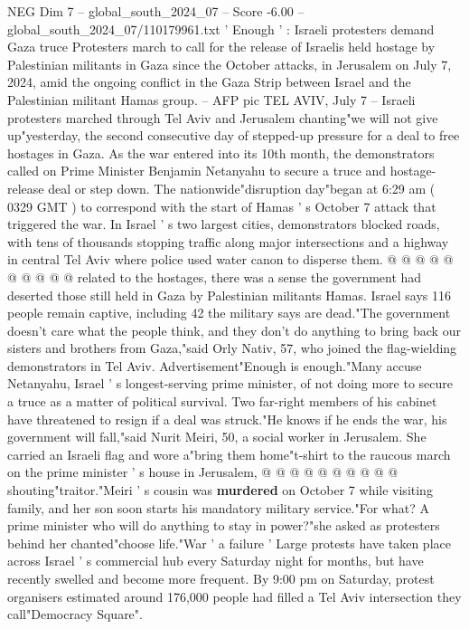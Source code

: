\begin{textsample}{NEG Dim 7 – global\_south\_2024\_07 – Score -6.00 – global\_south\_2024\_07/110179961.txt}  \label{ex:f7_neg_333}
' Enough ' : Israeli protesters demand Gaza truce Protesters march to call for the release of Israelis held hostage by Palestinian militants in Gaza since the October attacks, in Jerusalem on July 7, 2024, amid the ongoing conflict in the Gaza Strip between Israel and the Palestinian militant Hamas group. -- AFP pic TEL AVIV, July 7 -- Israeli protesters marched through Tel Aviv and Jerusalem chanting"we will not give up"yesterday, the second consecutive day of stepped-up pressure for a deal to free hostages in Gaza.
As the war entered into its 10th month, the demonstrators called on Prime Minister Benjamin Netanyahu to secure a truce and hostage-release deal or step down.
The nationwide"disruption day"began at 6:29 am ( 0329 GMT ) to correspond with the start of Hamas ' s October 7 attack that triggered the war.
In Israel ' s two largest cities, demonstrators blocked roads, with tens of thousands stopping traffic along major intersections and a highway in central Tel Aviv where police used water canon to disperse them. @ @ @ @ @ @ @ @ @ @ related to the hostages, there was a sense the government had deserted those still held in Gaza by Palestinian militants Hamas.
Israel says 116 people remain captive, including 42 the military says are dead."The government doesn't care what the people think, and they don't do anything to bring back our sisters and brothers from Gaza,"said Orly Nativ, 57, who joined the flag-wielding demonstrators in Tel Aviv.
Advertisement"Enough is enough."Many accuse Netanyahu, Israel ' s longest-serving prime minister, of not doing more to secure a truce as a matter of political survival.
Two far-right members of his cabinet have threatened to resign if a deal was struck."He knows if he ends the war, his government will fall,"said Nurit Meiri, 50, a social worker in Jerusalem.
She carried an Israeli flag and wore a"bring them home"t-shirt to the raucous march on the prime minister ' s house in Jerusalem, @ @ @ @ @ @ @ @ @ @ shouting"traitor."Meiri ' s cousin was \textbf{murdered} on October 7 while visiting family, and her son soon starts his mandatory military service."For what?
A prime minister who will do anything to stay in power?"she asked as protesters behind her chanted"choose life."War ' a failure ' Large protests have taken place across Israel ' s commercial hub every Saturday night for months, but have recently swelled and become more frequent.
By 9:00 pm on Saturday, protest organisers estimated around 176,000 people had filled a Tel Aviv intersection they call"Democracy Square".

\end{textsample}
